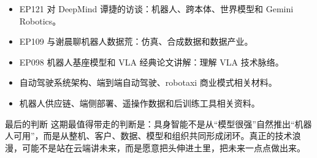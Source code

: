 \documentclass[a4paper]{article}
\begin{document}
\begin{itemize}
\item EP121 对 DeepMind 谭捷的访谈：机器人、跨本体、世界模型和 Gemini Robotics。
\item EP109 与谢晨聊机器人数据荒：仿真、合成数据和数据产业。
\item EP098 机器人基座模型和 VLA 经典论文讲解：理解 VLA 技术脉络。
\item 自动驾驶系统架构、端到端自动驾驶、robotaxi 商业模式相关材料。
\item 机器人供应链、端侧部署、遥操作数据和后训练工具相关资料。
\end{itemize}

\begin{importantbox}{最后的判断}
这期最值得带走的判断是：具身智能不是从“模型很强”自然推出“机器人可用”，而是从整机、客户、数据、模型和组织共同形成闭环。真正的技术浪漫，可能不是站在云端讲未来，而是愿意把头伸进土里，把未来一点点做出来。
\end{importantbox}
\end{document}
